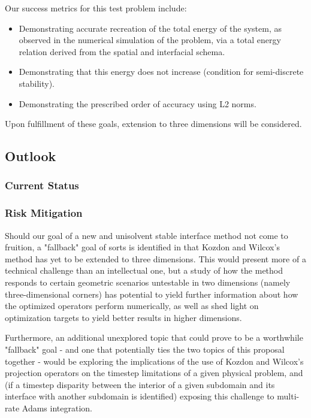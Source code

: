 Our success metrics for this test problem include:
\begin{itemize}
\item{Demonstrating accurate recreation of the total energy of the system, as observed in the
      numerical simulation of the problem, via a total energy relation derived from the
      spatial and interfacial schema.}
\item{Demonstrating that this energy does not increase (condition for semi-discrete stability).}
\item{Demonstrating the prescribed order of accuracy using L2 norms.}
\end{itemize}
Upon fulfillment of these goals, extension to three dimensions will be considered.

\subsection{Outlook}

\subsubsection{Current Status}

\subsubsection{Risk Mitigation}

Should our goal of a new and unisolvent stable interface method not come to
fruition, a "fallback" goal of sorts is identified in that Kozdon and Wilcox's
method has yet to be extended to three dimensions. This would present more of a
technical challenge than an intellectual one, but a study of how the method
responds to certain geometric scenarios untestable in two dimensions (namely
three-dimensional corners) has potential to yield further information about
how the optimized operators perform numerically, as well as shed light on
optimization targets to yield better results in higher dimensions.

Furthermore, an additional unexplored topic that could prove to be a worthwhile
"fallback" goal - and one that potentially ties the two topics of this proposal
together - would be exploring the implications of the use of Kozdon and Wilcox's
projection operators on the timestep limitations of a given physical problem, and
(if a timestep disparity between the interior of a given subdomain and its interface
with another subdomain is identified) exposing this challenge to multi-rate Adams
integration.

